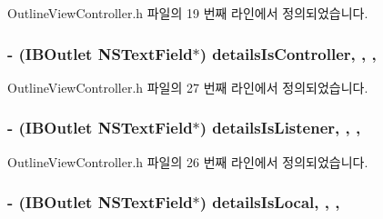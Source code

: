 Outline\+View\+Controller.\+h 파일의 19 번째 라인에서 정의되었습니다.

\subsubsection[{\texorpdfstring{details\+Is\+Controller}{detailsIsController}}]{\setlength{\rightskip}{0pt plus 5cm}-\/ (I\+B\+Outlet N\+S\+Text\+Field$\ast$) details\+Is\+Controller\hspace{0.3cm}{\ttfamily [read]}, {\ttfamily [write]}, {\ttfamily [atomic]}, {\ttfamily [weak]}}\hypertarget{interface_outline_view_controller_abdb488283412f83c5cde219dda7cc543}{}\label{interface_outline_view_controller_abdb488283412f83c5cde219dda7cc543}


Outline\+View\+Controller.\+h 파일의 27 번째 라인에서 정의되었습니다.

\subsubsection[{\texorpdfstring{details\+Is\+Listener}{detailsIsListener}}]{\setlength{\rightskip}{0pt plus 5cm}-\/ (I\+B\+Outlet N\+S\+Text\+Field$\ast$) details\+Is\+Listener\hspace{0.3cm}{\ttfamily [read]}, {\ttfamily [write]}, {\ttfamily [atomic]}, {\ttfamily [weak]}}\hypertarget{interface_outline_view_controller_a627aa74cdaf3b30d128506a71f0ab370}{}\label{interface_outline_view_controller_a627aa74cdaf3b30d128506a71f0ab370}


Outline\+View\+Controller.\+h 파일의 26 번째 라인에서 정의되었습니다.

\subsubsection[{\texorpdfstring{details\+Is\+Local}{detailsIsLocal}}]{\setlength{\rightskip}{0pt plus 5cm}-\/ (I\+B\+Outlet N\+S\+Text\+Field$\ast$) details\+Is\+Local\hspace{0.3cm}{\ttfamily [read]}, {\ttfamily [write]}, {\ttfamily [atomic]}, {\ttfamily [weak]}}\hypertarget{interface_outline_view_controller_a4ecd1fb010b36933aca363f1bc2cddf8}{}\label{interface_outline_view_controller_a4ecd1fb010b36933aca363f1bc2cddf8}


